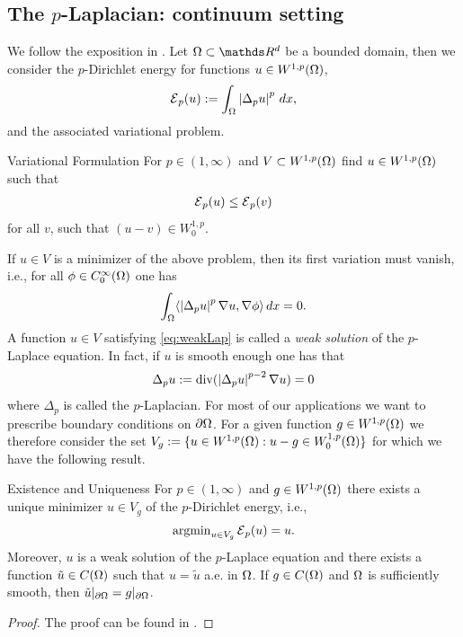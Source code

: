 \subsection{The $p$-Laplacian: continuum setting}\label{sec:pLapcont}
We follow the exposition in \cite{lindqvist2017notes}. Let $\domain\subset\R^d$ be a bounded domain, then 
we consider the $p$-Dirichlet energy for functions $u\in W^{1,p}(\Omega)$,
%
\begin{align}\label{eq:DirichletEnergy}
\mathcal{E}{}_p(u) := \int_\Omega \left|\Delta_p u\right|^p \, dx,
\end{align}
%
and the associated variational problem.
%
\begin{problem}{Variational Formulation}{}
For $p\in (1,\infty)$ and $V\subset W^{1,p}(\Omega)$ find $u\in W^{1,p}(\Omega)$ such that
%
\begin{align*}
\mathcal{E}{}_p(u) \leq \mathcal{E}{}_p(v)
\end{align*}
%
for all $v$, such that $(u-v)\in W^{1,p}_0$.
\end{problem}
%
If $u\in V$ is a minimizer of the above problem, then its first variation must vanish, i.e., for all $\phi\in C^\infty_0(\Omega)$ one has
%
\begin{align}\label{eq:weakLap}
\int_\Omega \langle \left|\Delta_p u\right|^p \nabla u, \nabla \phi \rangle \, dx = 0.
\end{align}
%
A function $u\in V$ satisfying \cref{eq:weakLap} is called a \emph{weak solution} of the $p$-Laplace equation. In fact, if $u$ 
is smooth enough one has that
%
\begin{align}\label{eq:strongLap}
\Delta_p u := \operatorname{div}(\left|\Delta_p u\right|^{p-2} \nabla u) = 0
\end{align}
%
where $\Delta_p$ is called the $p$-Laplacian. For most of our applications we want to prescribe boundary conditions on $\partial \Omega$. 
For a given function $g\in W^{1,p}(\Omega)$ we therefore consider the set 
$V_g := \{u\in W^{1,p}(\Omega): u-g \in W^{1,p}_0(\Omega)\}$ for which we have the following result.
%
\begin{theorem}{Existence and Uniqueness}{}
For $p\in (1,\infty)$ and $g\in W^{1,p}(\Omega)$ there exists a unique minimizer $u\in V_g$ of the $p$-Dirichlet energy, i.e.,
%
\begin{align*}
\operatorname{argmin}_{u\in V_g} \mathcal{E}{}_p(u) = u.
\end{align*}
%
Moreover, $u$ is a weak solution of the $p$-Laplace equation and there exists a function $\tilde{u}\in C(\Omega)$ such that
$u = \tilde{u}$ a.e. in $\Omega$. If $g\in C(\Omega)$ and $\Omega$ is sufficiently smooth, then 
$\tilde{u}\vert_{\partial \Omega} = g\vert_{\partial \Omega}$.
\end{theorem}
%
%
\begin{proof}
The proof can be found in \cite[Thm. 2.16]{lindqvist2017notes}.
\end{proof}
%
%
